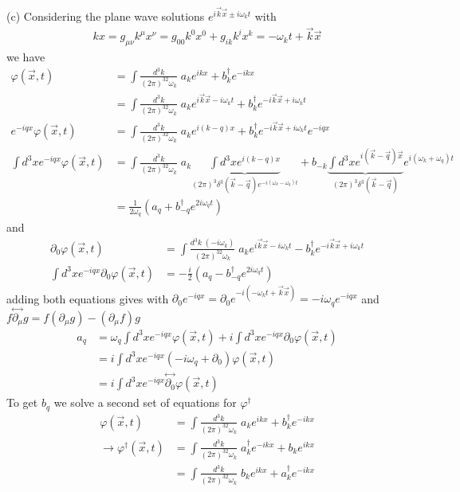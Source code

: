 \documentclass[10pt,a4paper]{book}
\theoremstyle{definition}
\begin{document}
(c) Considering the plane wave solutions $e^{i\vec{k}\vec{x}\pm i\omega_kt}$ with 
\begin{align}
kx=g_{\mu\nu}k^\mu x^\nu=g_{00}k^0x^0+g_{ik}k^ix^k=-\omega_kt+\vec{k}\vec{x}
\end{align}
we have
\begin{align}
\varphi(\vec{x},t)
&=\int\frac{d^3k}{(2\pi)^32\omega_k}\;a_ke^{ikx}+b^\dagger_ke^{-ikx}\\
&=\int\frac{d^3k}{(2\pi)^32\omega_k}\;a_ke^{i\vec{k}\vec{x}-i\omega_kt}+b^\dagger_ke^{-i\vec{k}\vec{x}+i\omega_kt}\\
e^{-iqx}\varphi(\vec{x},t)&=\int\frac{d^3k}{(2\pi)^32\omega_k}\;a_ke^{i(k-q)x}+b^\dagger_ke^{-i\vec{k}\vec{x}+i\omega_kt}e^{-iqx}\\
\int d^3xe^{-iqx}\varphi(\vec{x},t)
&=\int\frac{d^3k}{(2\pi)^32\omega_k} \;a_k\underbrace{\int d^3xe^{i(k-q)x}}_{(2\pi)^3\delta^3(\vec{k}-\vec{q})e^{-i(\omega_k-\omega_q)t}}+b_{-k}\underbrace{\int d^3xe^{i(\vec{k}-\vec{q})\vec{x}}}_{(2\pi)^3\delta^3(\vec{k}-\vec{q})}e^{i(\omega_k+\omega_q)t}\\
&=\frac{1}{2\omega_q}\left(a_q+b^\dagger_{-q}e^{2i\omega_qt}\right)
\end{align}
and
\begin{align}
\partial_0\varphi(\vec{x},t)&=\int\frac{d^3k\;(-i\omega_k)}{(2\pi)^32\omega_k}\;a_ke^{i\vec{k}\vec{x}-i\omega_kt}-b^\dagger_ke^{-i\vec{k}\vec{x}+i\omega_kt}\\
\int d^3x e^{-iqx}\partial_0\varphi(\vec{x},t)&=-\frac{i}{2}\left(a_q-b^\dagger_{-q}e^{2i\omega_qt}\right)
\end{align}
adding both equations gives with $\partial_0e^{-iqx}=\partial_0e^{-i(-\omega_kt+\vec{k}\vec{x})}=-i\omega_qe^{-iqx}$ and $f\stackrel{\leftrightarrow}{\partial_\mu}g=f(\partial_\mu g)-(\partial_\mu f)g$
\begin{align}
a_q&=\omega_q\int d^3x e^{-iqx}\varphi(\vec{x},t)+i\int d^3x e^{-iqx}\partial_0\varphi(\vec{x},t)\\
&=i\int d^3x e^{-iqx}(-i\omega_q+\partial_0)\varphi(\vec{x},t)\\
&=i\int d^3x e^{-iqx}\stackrel{\leftrightarrow}{\partial_0}\varphi(\vec{x},t)
\end{align}
To get $b_q$ we solve a second set of equations for $\varphi^\dagger$ 
\begin{align}
\varphi(\vec{x},t)
&=\int\frac{d^3k}{(2\pi)^32\omega_k}\;a_ke^{ikx}+b^\dagger_ke^{-ikx}\\
\rightarrow\varphi^\dagger(\vec{x},t)
&=\int\frac{d^3k}{(2\pi)^32\omega_k}\;a^\dagger_ke^{-ikx}+b_ke^{ikx}\\
&=\int\frac{d^3k}{(2\pi)^32\omega_k}\;b_ke^{ikx}+a^\dagger_ke^{-ikx}
\end{align}
\end{document}
